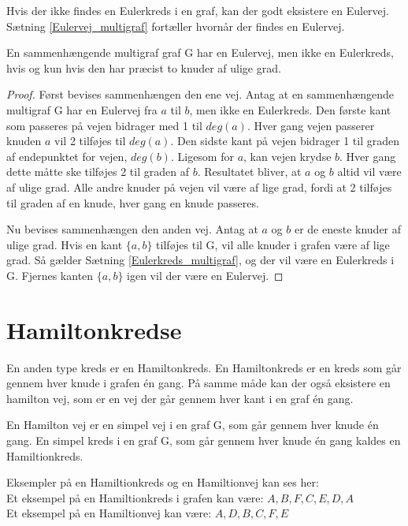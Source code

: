 \noindent Hvis der ikke findes en Eulerkreds i en graf, kan der godt eksistere en Eulervej. 
Sætning \ref{Eulervej_multigraf} fortæller hvornår der findes en Eulervej. 

\begin{thm} \label{Eulervej_multigraf}
En sammenhængende multigraf graf G har en Eulervej, men ikke en Eulerkreds, hvis og kun hvis den har præcist to knuder af ulige grad.  
\end{thm} 

\begin{proof}
Først bevises sammenhængen den ene vej. 
Antag at en sammenhængende multigraf G har en Eulervej fra $a$ til $b$, men ikke en Eulerkreds. 
Den første kant som passeres på vejen bidrager med 1 til $deg(a)$. 
Hver gang vejen passerer knuden $a$ vil 2 tilføjes til $deg(a)$. 
Den sidste kant på vejen bidrager 1 til graden af endepunktet for vejen, $deg(b)$. 
Ligesom for $a$, kan vejen krydse $b$. 
Hver gang dette måtte ske tilføjes 2 til graden af $b$. 
Resultatet bliver, at $a$ og $b$ altid vil være af ulige grad. 
Alle andre knuder på vejen vil være af lige grad, fordi at 2 tilføjes til graden af en knude, hver gang en knude passeres.  

Nu bevises sammenhængen den anden vej.
Antag at $a$ og $b$ er de eneste knuder af ulige grad. 
Hvis en kant $\lbrace a,b \rbrace$ tilføjes til G, vil alle knuder i grafen være af lige grad. 
Så gælder Sætning \ref{Eulerkreds_multigraf}, og der vil være en Eulerkreds i G. 
Fjernes kanten $\lbrace a,b \rbrace$ igen vil der være en Eulervej. 
\end{proof}

\section{Hamiltonkredse}
En anden type kreds er en Hamiltonkreds. 
En Hamiltonkreds er en kreds som går gennem hver knude i grafen én gang. På samme måde kan der også eksistere en hamilton vej, som er en vej der går gennem hver kant i en graf én gang. 

\begin{defn} \label{hamiltion_defn}
En Hamilton vej er en simpel vej i en graf G, som går gennem hver knude én gang.
En simpel kreds i en graf G, som går gennem hver knude én gang kaldes en Hamiltionkreds.
\end{defn}

\begin{exmp}
Eksempler på en Hamiltionkreds og en Hamiltionvej kan ses her: \\



\noindent Et eksempel på en Hamiltionkreds i grafen kan være: $A,B,F,C,E,D,A$\\
Et eksempel på en Hamiltionvej kan være: $A,D,B,C,F,E$
\end{exmp}

